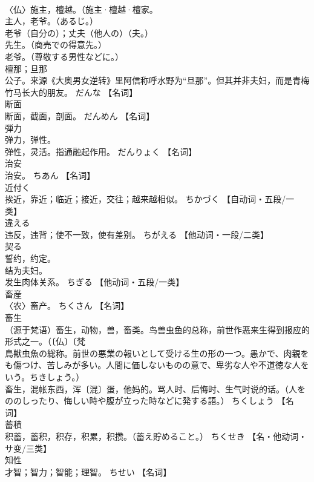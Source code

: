 \documentclass[8pt]{extreport}
\begin{document}
\begin{CJK}{UTF8}{min}
\\	〈仏〉施主，檀越。（施主·檀越·檀家。 
\\	主人，老爷。（あるじ。） 
\\	老爷（自分の）；丈夫（他人の）（夫。） 
\\	先生。（商売での得意先。） 
\\	老爷。（尊敬する男性などに。） 
\\	檀那；旦那 
\\	公子。来源《大奥男女逆转》里阿信称呼水野为“旦那”。但其并非夫妇，而是青梅竹马长大的朋友。	だんな		【名词】
\\	断面	
\\	断面，截面，剖面。	だんめん		【名词】
\\	弾力	
\\	弹力，弹性。 
\\	弹性，灵活。指通融起作用。	だんりょく		【名词】
\\	治安	
\\	治安。	ちあん		【名词】
\\	近付く	
\\	挨近，靠近；临近；接近，交往；越来越相似。	ちかづく		【自动词・五段/一类】
\\	違える	
\\	违反，违背；使不一致，使有差别。	ちがえる		【他动词・一段/二类】
\\	契る	
\\	誓约，约定。 
\\	结为夫妇。 
\\	发生肉体关系。	ちぎる		【他动词・五段/一类】
\\	畜産	
\\	〈农〉畜产。	ちくさん		【名词】
\\	畜生	
\\	（源于梵语）畜生，动物，兽，畜类。鸟兽虫鱼的总称，前世作恶来生得到报应的形式之一。（〔仏〕〔梵 
\\	鳥獣虫魚の総称。前世の悪業の報いとして受ける生の形の一つ。愚かで、肉親をも傷つけ、苦しみが多い。人間に価しないものの意で、卑劣な人や不道徳な人をいう。ちきしょう。） 
\\	畜生，混帐东西，浑〔混〕蛋，他妈的。骂人时、后悔时、生气时说的话。（人をののしったり、悔しい時や腹が立った時などに発する語。）	ちくしょう		【名词】
\\	蓄積	
\\	积蓄，蓄积，积存，积累，积攒。（蓄え貯めること。）	ちくせき		【名・他动词・サ变/三类】
\\	知性	
\\	才智；智力；智能；理智。	ちせい		【名词】

\end{CJK}
\end{document}
